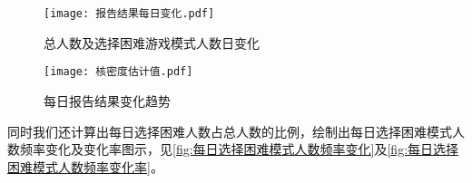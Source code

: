 \documentclass{MathModeling}
\begin{document}
	\begin{figure}[H]
		\centering
		\begin{minipage}{0.48\linewidth}
			\centering
			\texttt{[image: 报告结果每日变化.pdf]}
			\caption{总人数及选择困难游戏模式人数日变化}
			\label{fig:总人数及选择困难游戏模式人数变化图}
		\end{minipage}
		\begin{minipage}{0.48\linewidth}
			\centering
			\texttt{[image: 核密度估计值.pdf]}
			\caption{每日报告结果变化趋势}
			\label{fig:每日报告结果变化趋势}
		\end{minipage}
	\end{figure}

	同时我们还计算出每日选择困难人数占总人数的比例，绘制出每日选择困难模式人数频率变化及变化率图示，见\textcolor{blue}{\cref{fig:每日选择困难模式人数频率变化}}及\textcolor{blue}{\cref{fig:每日选择困难模式人数频率变化率}}。
\end{document}
